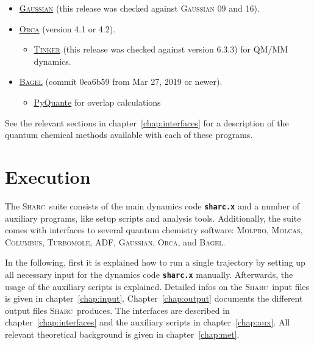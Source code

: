 \documentclass[a4paper,10pt,DIV=15,openany]{scrbook}
\newcommand{\link}[2]{\href{#1}{#2}}
\newcommand{\sharc}{\textsc{Sharc}}
\newcommand{\ttt}[1]{\textbf{\texttt{#1}}}
\begin{document}
\begin{itemize}
\begin{itemize}
  \end{itemize}
  \item \link{http://www.gaussian.com}{\textsc{Gaussian}} (this release was checked against \textsc{Gaussian} 09 and 16).
  \item \link{https://orcaforum.kofo.mpg.de}{\textsc{Orca}} (version 4.1 or 4.2).
  \begin{itemize}
    \item \link{http://dasher.wustl.edu/tinker/}{\textsc{Tinker}} (this release was checked against version 6.3.3) for QM/MM dynamics.
  \end{itemize}
  \item \link{https://nubakery.org/index.html}{\textsc{Bagel}} (commit 0ea6b59 from Mar 27, 2019 or newer).
  \begin{itemize}
    \item \link{http://pyquante.sourceforge.net/}{PyQuante} for overlap calculations
  \end{itemize}
\end{itemize}

See the relevant sections in chapter~\ref{chap:interfaces} for a description of the quantum chemical methods available with each of these programs.


\chapter{Execution}

The \sharc\ suite consists of the main dynamics code \ttt{sharc.x} and a number of auxiliary programs, like setup scripts and analysis tools. Additionally, the suite comes with interfaces to several quantum chemistry software: \textsc{Molpro}, \textsc{Molcas}, \textsc{Columbus}, \textsc{Turbomole}, \textsc{ADF}, \textsc{Gaussian}, \textsc{Orca}, and \textsc{Bagel}.

In the following, first it is explained how to run a single trajectory by setting up all necessary input for the dynamics code \ttt{sharc.x} manually. Afterwards, the usage of the auxiliary scripts is explained. 
Detailed infos on the \sharc\ input files is given in chapter~\ref{chap:input}.
Chapter~\ref{chap:output} documents the different output files \sharc\ produces.
The interfaces are described in chapter~\ref{chap:interfaces} and the auxiliary scripts in chapter~\ref{chap:aux}. 
All relevant theoretical background is given in chapter~\ref{chap:met}.
\end{document}
